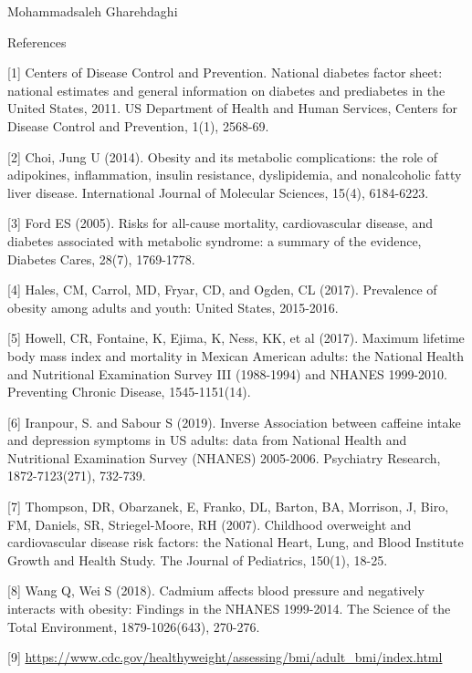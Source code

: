 \documentclass[12pt]{article}
\numberwithin{figure}{section}
\begin{document}
{\sf Mohammadsaleh Gharehdaghi}\\

\newpage

{\sf References}

[1] Centers of Disease Control and Prevention. National diabetes factor sheet: national estimates and general information on diabetes and prediabetes in the United States, 2011. US Department of Health and Human Services, Centers for Disease Control and Prevention, 1(1), 2568-69.

[2] Choi, Jung U (2014). Obesity and its metabolic complications: the role of adipokines, inflammation, insulin resistance, dyslipidemia, and nonalcoholic fatty liver disease.  International Journal of Molecular Sciences, 15(4), 6184-6223.

[3] Ford ES (2005). Risks for all-cause mortality, cardiovascular disease, and diabetes associated with metabolic syndrome: a summary of the evidence, Diabetes Cares, 28(7), 1769-1778.

[4] Hales, CM, Carrol, MD, Fryar, CD, and Ogden, CL (2017). Prevalence of obesity among adults and youth: United States, 2015-2016.

[5] Howell, CR, Fontaine, K, Ejima, K, Ness, KK, et al (2017). Maximum lifetime body mass index and mortality in Mexican American adults: the National Health and Nutritional Examination Survey III (1988-1994) and NHANES 1999-2010. Preventing Chronic Disease, 1545-1151(14).

[6] Iranpour, S. and Sabour S (2019). Inverse Association between caffeine intake and depression symptoms in US adults: data from National Health and Nutritional Examination Survey (NHANES) 2005-2006. Psychiatry Research, 1872-7123(271), 732-739.

[7] Thompson, DR, Obarzanek, E, Franko, DL, Barton, BA, Morrison, J, Biro, FM, Daniels, SR, Striegel-Moore, RH (2007).  Childhood overweight and cardiovascular disease risk factors: the National Heart, Lung, and Blood Institute Growth and Health Study. The Journal of Pediatrics, 150(1), 18-25.

[8] Wang Q, Wei S (2018). Cadmium affects blood pressure and negatively interacts with obesity: Findings in the NHANES 1999-2014. The Science of the Total Environment, 1879-1026(643), 270-276.

[9] \url{https://www.cdc.gov/healthyweight/assessing/bmi/adult_bmi/index.html}
\end{document}
